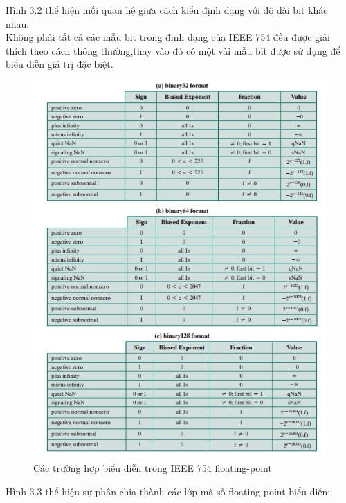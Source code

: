 \documentclass[11pt,a4paper,vietnamese]{report}
\begin{document}
Hình 3.2 thể hiện mối quan hệ giữa cách kiểu định dạng với độ dài bit khác nhau.\\
Không phải tất cả các mẫu bit trong định dạng của IEEE 754 đều được giải thích theo cách thông thường,thay vào đó có một vài mẫu bit được sử dụng để biểu diễn giá trị đặc biệt.
\begin{center}
    \begin{figure}[htp]
    \begin{center}
     \includegraphics[scale=.8]{image/fig5}
    \end{center}
    \caption{Các trường hợp biểu diễn trong IEEE 754 floating-point}
    \label{reffig5}
    \end{figure}
\end{center}
Hình 3.3 thể hiện sự phân chia thành các lớp mà số floating-point biểu diễn:
\end{document}
